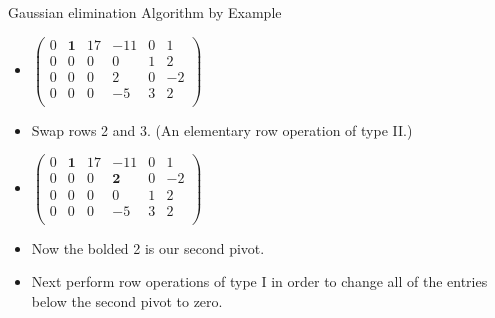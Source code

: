 \documentclass{beamer}
\begin{document}
\begin{frame}{Gaussian elimination Algorithm by Example}

\begin{itemize}
\item $
\begin{pmatrix}
0 & \textbf{1} &  17   &  -11   &  0  &  1   \\
0 &         0  &   0   &   0    &  1  &  2   \\
0 &         0  &   0   &   2   &   0  &  -2  \\
0 &         0  &   0   &  -5   &   3  &  2   \\
\end{pmatrix}
$
\item Swap rows 2 and 3. (An elementary row operation of type II.)
\item $
\begin{pmatrix}
0 & \textbf{1} &  17   &          -11   &  0  &  1  \\
0 &         0  &   0   &   \textbf{2}   &  0  &  -2 \\
0 &         0  &   0   &           0    &  1  &  2 \\
0 &         0  &   0   &          -5    &  3  &  2 \\
\end{pmatrix}
$
\item Now the bolded 2 is our second pivot.
\item Next perform row operations of type I in order to change all of the
entries below the second pivot to zero.
\end{itemize}
\end{frame}

\end{document}
